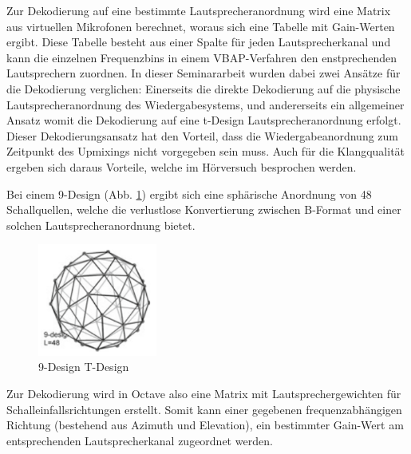 Zur Dekodierung auf eine bestimmte Lautsprecheranordnung wird eine Matrix aus virtuellen Mikrofonen berechnet, woraus sich eine Tabelle mit Gain-Werten ergibt. Diese Tabelle besteht aus einer Spalte für jeden Lautsprecherkanal und kann die einzelnen Frequenzbins in einem VBAP-Verfahren den enstprechenden Lautsprechern zuordnen. In dieser Seminararbeit wurden dabei zwei Ansätze für die Dekodierung verglichen: Einerseits die direkte Dekodierung auf die physische Lautsprecheranordnung des Wiedergabesystems, und andererseits ein allgemeiner Ansatz womit die Dekodierung auf eine t-Design Lautsprecheranordnung erfolgt. Dieser Dekodierungsansatz hat den Vorteil, dass die Wiedergabeanordnung zum Zeitpunkt des Upmixings nicht vorgegeben sein muss. Auch für die Klangqualität ergeben sich daraus Vorteile, welche im Hörversuch besprochen werden.

Bei einem 9-Design (Abb. \ref{fig:tdesign_image}) ergibt sich eine sphärische Anordnung von 48 Schallquellen, welche die verlustlose Konvertierung zwischen B-Format und einer solchen Lautsprecheranordnung bietet.

\begin{figure}[!ht]
  \centering
  \includegraphics[width=0.35\textwidth]{implementierung/plots/t-design.png}
  \caption{9-Design T-Design \cite{ambi-book}}
  \label{fig:tdesign_image}
\end{figure}

Zur Dekodierung wird in Octave also eine Matrix mit Lautsprechergewichten für Schalleinfallsrichtungen erstellt. Somit kann einer gegebenen frequenzabhängigen Richtung (bestehend aus Azimuth und Elevation), ein bestimmter Gain-Wert am entsprechenden Lautsprecherkanal zugeordnet werden.
